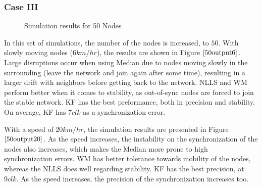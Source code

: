 \documentclass[journal]{IEEEtran}
\begin{document}
\subsubsection{\textbf{Case III}}
\begin{figure}
\centerline{  \hfil {}} \caption{Simulation results for 50 Nodes}
\label{50output}
\end{figure}
In this set of simulations, the number of the nodes is increased, to
$50$. With slowly moving nodes ($6km/hr$), the results are shown in
Figure $\ref{50output6}$. Large disruptions occur when using Median
due to nodes moving slowly in the surrounding (leave the network and
join again after some time), resulting in a larger drift with
neighbors before getting back to the network. NLLS and WM perform
better when it comes to stability, as out-of-sync nodes are forced to join the stable network. KF has the best preformance, both in
precision and stability. On average, KF has $7clk$ as a synchronization error.
\par
With a speed of $20km/hr$, the simulation results are presented in Figure $\ref{50output20}$. As the speed increases, the instability
on the synchronization of the nodes also increases, which makes the Median more prone to high synchronization errors. WM has better
tolerance towards mobility of the nodes, whereas the NLLS does well regarding stability. KF has the best precision, at $9clk$. As the
speed increases, the precision of the synchronization increases too.
\end{document}
